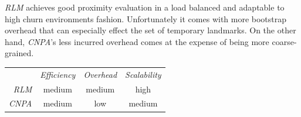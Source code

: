 \emph{RLM} achieves good proximity evaluation in a load balanced and adaptable to
high churn environments fashion. Unfortunately it comes with more bootstrap
overhead that can especially effect the set of temporary landmarks. On the other
hand, \emph{CNPA}'s less incurred overhead comes at the expense of being more
coarse-grained.



%
%
%

\begin{center}
{\footnotesize
\begin{tabular}{rccc}
\multicolumn{1}{r}{} &
\multicolumn{1}{c}{\emph{Efficiency}} &
\multicolumn{1}{c}{\emph{Overhead}} &
\multicolumn{1}{c}{\emph{Scalability}}
\\
\cline{2-4}
\emph{RLM} &
%
medium &
%
medium &
high \\
\emph{CNPA} &
%
medium &
low &
medium \\
\end{tabular}
}
\end{center}

